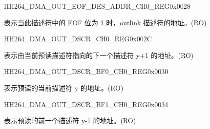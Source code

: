     
    \begin{register}{H}{H264\_DMA\_OUT\_EOF\_DES\_ADDR\_CH0\_REG}{0x0028}\label{regdesc:H264DMAOUTEOFDESADDRCH0REG}
    \regnewline%
    \begin{regdesc}\begin{reglist}
    \label{fielddesc:H264DMAOUTEOFDESADDRCH0}\item [H264\_DMA\_OUT\_EOF\_DES\_ADDR\_CH0] 表示当此描述符中的 EOF 位为 1 时，outlink 描述符的地址。(RO)
    \end{reglist}\end{regdesc}
    \end{register}
    
    
    \begin{register}{H}{H264\_DMA\_OUT\_DSCR\_CH0\_REG}{0x002C}\label{regdesc:H264DMAOUTDSCRCH0REG}
    \regnewline%
    \begin{regdesc}\begin{reglist}
    \label{fielddesc:H264DMAOUTLINKDSCRCH0}\item [H264\_DMA\_OUTLINK\_DSCR\_CH0] 表示由当前预读描述符指向的下一个描述符 y+1 的地址。(RO)
    \end{reglist}\end{regdesc}
    \end{register}
    
    
    \begin{register}{H}{H264\_DMA\_OUT\_DSCR\_BF0\_CH0\_REG}{0x0030}\label{regdesc:H264DMAOUTDSCRBF0CH0REG}
    \regnewline%
    \begin{regdesc}\begin{reglist}
    \label{fielddesc:H264DMAOUTLINKDSCRBF0CH0}\item [H264\_DMA\_OUTLINK\_DSCR\_BF0\_CH0] 表示预读的当前描述符 y 的地址。(RO)
    \end{reglist}\end{regdesc}
    \end{register}
    
    
    \begin{register}{H}{H264\_DMA\_OUT\_DSCR\_BF1\_CH0\_REG}{0x0034}\label{regdesc:H264DMAOUTDSCRBF1CH0REG}
    \regnewline%
    \begin{regdesc}\begin{reglist}
    \label{fielddesc:H264DMAOUTLINKDSCRBF1CH0}\item [H264\_DMA\_OUTLINK\_DSCR\_BF1\_CH0] 表示预读的前一个描述符 y-1 的地址。(RO)
    \end{reglist}\end{regdesc}
    \end{register}
    
